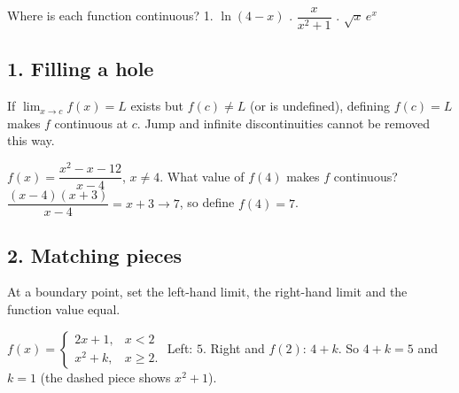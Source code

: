 \begin{quickcheck}
Where is each function continuous? 1. $\ln(4-x)$ . $\dfrac{x}{x^2+1}$ . $\sqrt{x}\,e^x$
\qcanswers{1. $(-\infty,4)$. \ 2. All real numbers. \ 3. $[0,\infty)$.}
\end{quickcheck}


\subsection*{1. Filling a hole}
If $\lim_{x\to c}f(x)=L$ exists but $f(c)\neq L$ (or is undefined), defining $f(c)=L$ makes $f$ continuous at $c$. Jump and infinite discontinuities cannot be removed this way.

\begin{example}[Example 1]
$f(x)=\dfrac{x^2-x-12}{x-4}$, $x\neq4$. What value of $f(4)$ makes $f$ continuous?
\sol $\dfrac{(x-4)(x+3)}{x-4}=x+3\to7$, so define $f(4)=7$.
\end{example}

\subsection*{2. Matching pieces}
At a boundary point, set the left-hand limit, the right-hand limit and the function value equal.

\begin{example}
\begin{center}
\end{center}
$f(x)=\begin{cases}2x+1, & x<2\\ x^2+k, & x\ge2.\end{cases}$
\sol Left: $5$. Right and $f(2)$: $4+k$. So $4+k=5$ and $k=1$ (the dashed piece shows $x^2+1$).
\end{example}

